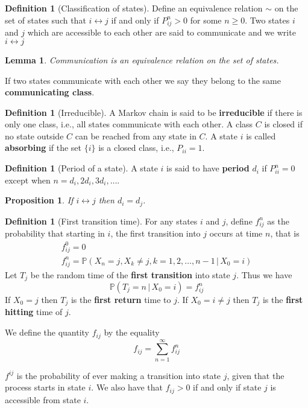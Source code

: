 \documentclass[10pt, oneside, reqno]{amsart}
\theoremstyle{plain}%
\newtheorem{lem}[thm]{Lemma}
\newtheorem{prop}[thm]{Proposition}
\theoremstyle{definition}
\newtheorem{defn}[thm]{Definition}
\theoremstyle{remark}
\newcommand{\prob}[1]{\mathbb{P}(#1)}
\newcommand{\given}{ \, | \,}
\begin{document}
\begin{defn}[Classification of states]
    Define an equivalence relation $\sim$ on the set of states such that $i \leftrightarrow j$ if and only if $P^n_{ij} > 0$ for some $n \geq 0$.  Two states $i$ and $j$ which are accessible to each other are said to communicate and we write $i \leftrightarrow j$
\end{defn}

\begin{lem}
    Communication is an equivalence relation on the set of states.
\end{lem}

If two states communicate with each other we say they belong to the same \textbf{communicating class}.  

\begin{defn}[Irreducible]
    A Markov chain is said to be \textbf{irreducible} if there is only one class, i.e., all states communicate with each other.  A class $C$ is closed if no state outside $C$ can be reached from any state in $C$.  A state $i$ is called \textbf{absorbing} if the set $\{i \}$ is a closed class, i.e., $P_{ii} = 1$.
\end{defn}

\begin{defn}[Period of a state]
    A state $i$ is said to have \textbf{period} $d_i$ if $P^{n}_{ii} = 0$ except when $n = d_i, 2d_i, 3d_i, \dots$.
\end{defn}

\begin{prop}
    If $i \leftrightarrow j$ then $d_i = d_j$.  
\end{prop}

\begin{defn}[First transition time]
    For any states $i$ and $j$, define $f^n_{ij}$ as the probability that starting in $i$, the first transition into $j$ occurs at time $n$, that is \begin{align*}
        f^0_{ij} = 0 \\
        f^n_{ij} = \prob{X_n = j, X_k \neq j, k = 1,2,\dots, n-1 \, | \, X_0 = i}
    \end{align*}
Let $T_j$ be the random time of the \textbf{first transition} into state $j$.  Thus we have \[
    \prob{T_j = n \given X_0 = i} = f^n_{ij}
\]
If $X_0 = j$ then $T_j$ is the \textbf{first return} time to $j$.  If $X_0 = i \neq j$ then $T_j$ is the \textbf{first hitting} time of $j$.

We define the quantity $f_{ij}$ by the equality \[
    f_{ij} = \sum_{n=1}^\infty f^n_{ij}
\]

$f^{ij}$ is the probability of ever making a transition into state $j$, given that the process starts in state $i$.  We also have that $f_{ij} > 0$ if and only if state $j$ is accessible from state $i$.
\end{defn}
\end{document}
